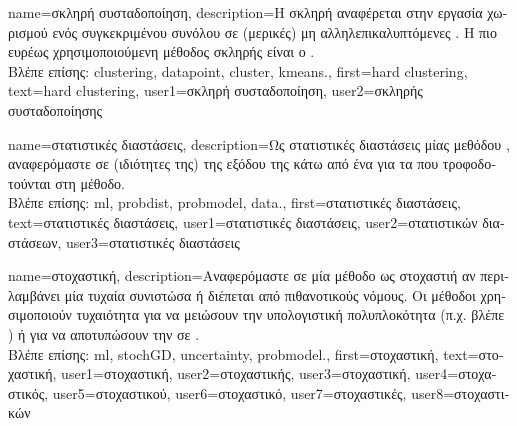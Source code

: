{name={\foreignlanguage{greek}{σκληρή συσταδοποίηση}}, 
	description={\foreignlanguage{greek}{Η σκληρή} 
		\foreignlanguage{greek}{αναφέρεται στην εργασία χωρισμού ενός συγκεκριμένου συνόλου}  
		\foreignlanguage{greek}{σε (μερικές) μη αλληλεπικαλυπτόμενες} . 
		\foreignlanguage{greek}{Η πιο ευρέως χρησιμοποιούμενη μέθοδος σκληρής}  \foreignlanguage{greek}{είναι ο} 
		.\\
		\foreignlanguage{greek}{Βλέπε επίσης:} \gls{clustering}, \gls{datapoint}, \gls{cluster}, \gls{kmeans}.},
	first={hard clustering},
	text={hard clustering},
	user1={\foreignlanguage{greek}{σκληρή συσταδοποίηση}}, %
	user2={\foreignlanguage{greek}{σκληρής συσταδοποί\-ησης}} %
}

{name={\foreignlanguage{greek}{στατιστικές διαστάσεις}}, 
	description={\foreignlanguage{greek}{Ως στατιστικές διαστάσεις μίας μεθόδου} 
		, \foreignlanguage{greek}{αναφερόμαστε σε (ιδιότητες της)}  \foreignlanguage{greek}{της 
		εξόδου της κάτω από ένα}  \foreignlanguage{greek}{για τα}  
		\foreignlanguage{greek}{που τροφοδοτούνται στη μέθοδο.} \\
		\foreignlanguage{greek}{Βλέπε επίσης:} \gls{ml}, \gls{probdist}, \gls{probmodel}, \gls{data}.},
	first={\foreignlanguage{greek}{στατιστικές διαστάσεις}},
	text={\foreignlanguage{greek}{στατιστικές διαστάσεις}},
	user1={\foreignlanguage{greek}{στατιστικές διαστάσεις}}, %
	user2={\foreignlanguage{greek}{στατιστικών διαστάσεων}}, %
	user3={\foreignlanguage{greek}{στατιστικές διαστάσεις}} %
}

{name={\foreignlanguage{greek}{στοχαστική}},
	description={\foreignlanguage{greek}{Αναφερόμαστε σε μία μέθοδο ως στοχαστιή} 
		\foreignlanguage{greek}{αν περιλαμβάνει μία τυχαία συνιστώσα ή διέπεται από πιθανοτικούς 
		νόμους. Οι μέθοδοι}  \foreignlanguage{greek}{χρησιμοποιούν τυχαιότητα για να 
		μειώσουν την υπολογιστική πολυπλοκότητα (π.χ. βλέπε} ) 
		\foreignlanguage{greek}{ή για να αποτυπώσουν την}  
		\foreignlanguage{greek}{σε} . \\
		\foreignlanguage{greek}{Βλέπε επίσης:} \gls{ml}, \gls{stochGD}, \gls{uncertainty}, \gls{probmodel}.},
	first={\foreignlanguage{greek}{στοχαστική}},
	text={\foreignlanguage{greek}{στοχαστική}}, 
	user1={\foreignlanguage{greek}{στοχαστική}}, %
	user2={\foreignlanguage{greek}{στοχαστικής}}, %
	user3={\foreignlanguage{greek}{στοχαστική}}, %
	user4={\foreignlanguage{greek}{στοχαστικός}}, %
	user5={\foreignlanguage{greek}{στοχαστικού}}, %
	user6={\foreignlanguage{greek}{στοχαστικό}}, %
	user7={\foreignlanguage{greek}{στοχαστικές}}, %
	user8={\foreignlanguage{greek}{στοχαστικών}} %
}

